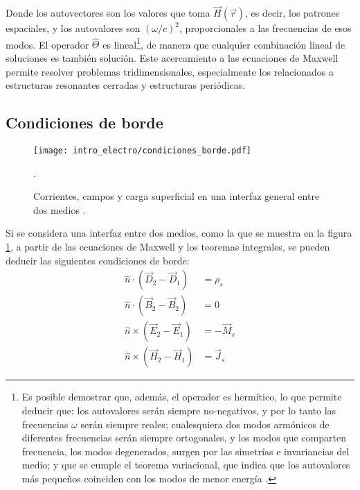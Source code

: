 Donde los autovectores son los valores que toma $\vec{H}(\vec{r})$, es decir, los patrones espaciales, y los autovalores son $(\omega/c)^2$, proporcionales a las frecuencias de esos modos. El operador $\hat{\Theta}$ es lineal\footnote{Es posible demostrar que, además, el operador es hermítico, lo que permite deducir que: los autovalores serán siempre no-negativos, y por lo tanto las frecuencias $\omega$ serán siempre reales; cualesquiera dos modos armónicos de diferentes frecuencias serán siempre ortogonales, y los modos que comparten frecuencia, los modos degenerados, surgen por las simetrías e invariancias del medio; y que se cumple el teorema variacional, que indica que los autovalores más pequeños coinciden con los modos de menor energía \cite{Joannopoulos:PhotonicCrystals}.}, de manera que cualquier combinación lineal de soluciones es también solución. Este acercamiento a las ecuaciones de Maxwell permite resolver problemas tridimensionales, especialmente los relacionados a estructuras resonantes cerradas y estructuras periódicas.

\subsection{Condiciones de borde} \label{sec:condiciones-borde}

\begin{figure}[htp]
	\centering
	\texttt{[image: intro\_electro/condiciones\_borde.pdf]}
	\caption{Corrientes, campos y carga superficial en una interfaz general entre dos medios \cite{Pozar:MwEngineering}.}.
	\label{fig:condiciones_borde}
\end{figure}

Si se considera una interfaz entre dos medios, como la que se muestra en la figura \ref{fig:condiciones_borde}, a partir de las ecuaciones de Maxwell y los teoremas integrales, se pueden deducir las siguientes condiciones de borde:
\begin{subequations}
	\label{eq:condiciones_borde}
	\begin{align}
		\hat{n} \cdot (\vec{D}_{2} - \vec{D}_{1}) & = \rho_s \\
		\hat{n} \cdot (\vec{B}_{2} - \vec{B}_{2}) & = 0 \\
		\hat{n} \times (\vec{E}_2 - \vec{E}_1)  & = - \vec{M}_s \\
		\hat{n} \times (\vec{H}_2 - \vec{H}_1) & = \vec{J}_s
	\end{align}
\end{subequations}

